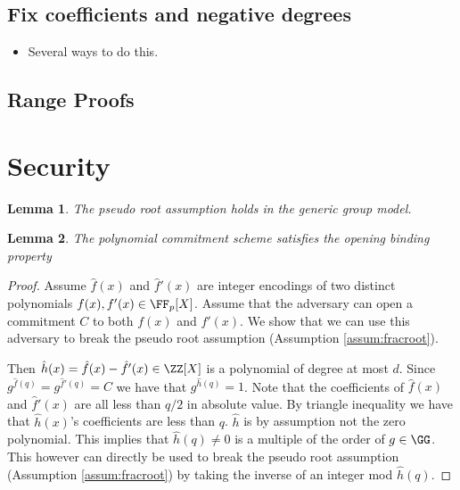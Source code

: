 \documentclass{article}
\newtheorem{lemma}{Lemma}
\begin{document}
\subsection{Fix coefficients and negative degrees}
\begin{itemize}
	\item Several ways to do this.
\end{itemize}
\subsection{Range Proofs}

\section{Security}


\begin{lemma}
	The pseudo root assumption holds in the generic group model.
\end{lemma}
\begin{lemma}
	The polynomial commitment scheme satisfies the opening binding property
\end{lemma}
\begin{proof}
	Assume $\hat{f}(x)$ and $\hat{f}'(x)$ are integer encodings of two distinct polynomials $f(x),f'(x) \in \FF_p[X]$. Assume that the adversary can open a commitment $C$ to both $f(x)$ and $f'(x)$. We show that we can use this adversary to break the pseudo root assumption (Assumption \ref{assum:fracroot}).
	
	 Then $\hat{h}(x)=\hat{f}(x)-\hat{f}'(x) \in \ZZ[X]$ is a polynomial of degree at most $d$. Since $g^{\hat{f}(q)}=g^{\hat{f}'(q)}=C$ we have that $g^{\hat{h}(q)}=1$. Note that the coefficients of $\hat{f}(x)$ and $\hat{f}'(x)$ are all less than $q/2$ in absolute value. By triangle inequality we have that $\hat{h}(x)$'s coefficients are less than $q$. $\hat{h}$ is by assumption not the zero polynomial. This implies that $\hat{h}(q)\neq 0$ is a multiple of the order of $g\in \GG$. This however can directly be used to break the pseudo root assumption (Assumption \ref{assum:fracroot}) by taking the inverse of an integer mod $\hat{h}(q)$.
\end{proof}
\end{document}
